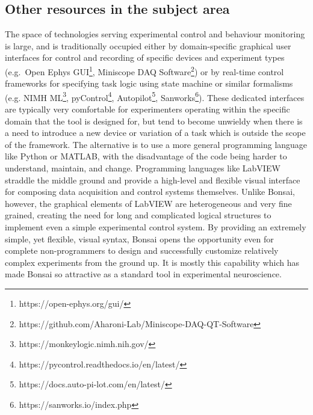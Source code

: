 \subsection*{Other resources in the subject area}

The space of technologies serving experimental control and behaviour monitoring
is large, and is traditionally occupied either by domain-specific graphical
user interfaces for control and recording of specific devices and experiment
types (e.g.\ Open Ephys
GUI\footnote{https://open-ephys.org/gui/},
Miniscope DAQ
Software\footnote{https://github.com/Aharoni-Lab/Miniscope-DAQ-QT-Software})
or by real-time control frameworks for specifying task logic using state
machine or similar formalisms (e.g. NIMH ML\footnote{https://monkeylogic.nimh.nih.gov/},
pyControl\footnote{https://pycontrol.readthedocs.io/en/latest/},
Autopilot\footnote{https://docs.auto-pi-lot.com/en/latest/},
Sanworks\footnote{https://sanworks.io/index.php}).
These dedicated interfaces are typically very comfortable for experimenters
operating within the specific domain that the tool is designed for, but tend to
become unwieldy when there is a need to introduce a new device or variation of
a task which is outside the scope of the framework. The alternative is to use a
more general programming language like Python or MATLAB, with the disadvantage
of the code being harder to understand, maintain, and change. Programming
languages like LabVIEW straddle the middle ground and provide a high-level and
flexible visual interface for composing data acquisition and control systems
themselves. Unlike Bonsai, however, the graphical elements of LabVIEW are
heterogeneous and very fine grained, creating the need for long and complicated
logical structures to implement even a simple experimental control system. By
providing an extremely simple, yet flexible, visual syntax, Bonsai opens the
opportunity even for complete non-programmers to design and successfully
customize relatively complex experiments from the ground up. It is mostly this
capability which has made Bonsai so attractive as a standard tool in
experimental neuroscience.

